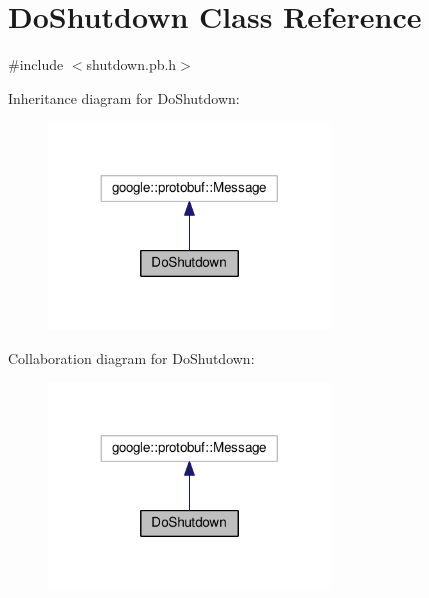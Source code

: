 \hypertarget{class_do_shutdown}{}\section{Do\+Shutdown Class Reference}
\label{class_do_shutdown}


{\ttfamily \#include $<$shutdown.\+pb.\+h$>$}



Inheritance diagram for Do\+Shutdown\+:\nopagebreak
\begin{figure}[H]
\begin{center}
\leavevmode
\includegraphics[width=212pt]{class_do_shutdown__inherit__graph}
\end{center}
\end{figure}


Collaboration diagram for Do\+Shutdown\+:\nopagebreak
\begin{figure}[H]
\begin{center}
\leavevmode
\includegraphics[width=212pt]{class_do_shutdown__coll__graph}
\end{center}
\end{figure}
